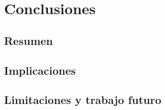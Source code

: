 
\chapter{Conclusiones}
\label{sec:conclusion}

{
\color{gray}
\Blindtext[2][1]
}
\section{Resumen}
\label{sec:conclusion:sec1}
{
\color{gray}
\Blindtext[2][2]
}

\section{Implicaciones}
\label{sec:conclusion:sec2}
{
\color{gray}
\Blindtext[3][2]
}

\section{Limitaciones y trabajo futuro}
\label{sec:conclusion:future}
{
\color{gray}
\Blindtext[2][2]
}